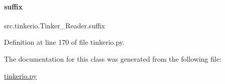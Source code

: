 \paragraph{\texorpdfstring{suffix}{suffix}}
{\footnotesize\ttfamily src.\+tinkerio.\+Tinker\+\_\+\+Reader.\+suffix}



Definition at line 170 of file tinkerio.\+py.



The documentation for this class was generated from the following file\+:\begin{DoxyCompactItemize}
\item 
\hyperlink{tinkerio_8py}{tinkerio.\+py}\end{DoxyCompactItemize}
